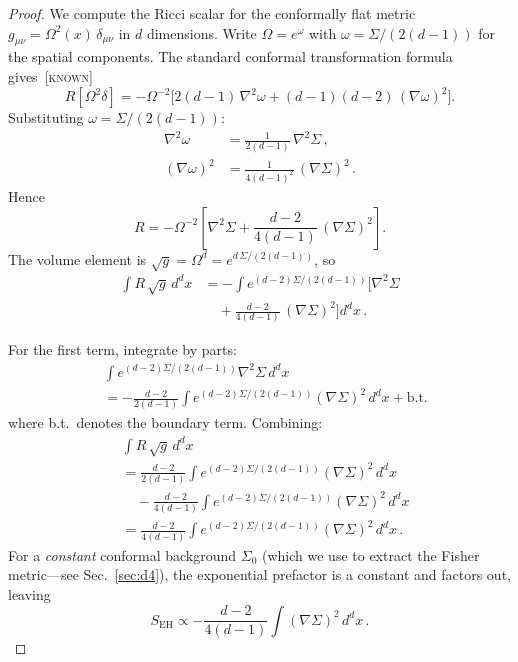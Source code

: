 \documentclass[prd,twocolumn,superscriptaddress,longbibliography]{revtex4-2}
\newcommand{\SEH}{S_{\mathrm{EH}}}
\newcommand{\known}{\textsc{[known]}}
\begin{document}
\begin{proof}
We compute the Ricci scalar for the conformally
flat metric $g_{\mu\nu} = \Omega^2(x)\,\delta_{\mu\nu}$ in
$d$ dimensions.
Write $\Omega = e^{\omega}$ with $\omega = \Sigma/(2(d-1))$
for the spatial components.
The standard conformal transformation
formula~\cite{Wald1984} gives~\known
\begin{equation}\label{eq:R_conformal}
  R[\Omega^2\delta]
  = -\Omega^{-2}\!\Big[
  2(d\!-\!1)\,\nabla^2\omega
  + (d\!-\!1)(d\!-\!2)\,(\nabla\omega)^2
  \Big].
\end{equation}
Substituting $\omega = \Sigma/(2(d-1))$:
\begin{align}
  \nabla^2\omega &= \frac{1}{2(d-1)}\,\nabla^2\Sigma\,,\\[3pt]
  (\nabla\omega)^2 &= \frac{1}{4(d-1)^2}\,(\nabla\Sigma)^2\,.
\end{align}
Hence
\begin{equation}\label{eq:R_intermediate}
  R = -\Omega^{-2}\!\left[
  \nabla^2\Sigma
  + \frac{d-2}{4(d-1)}\,(\nabla\Sigma)^2
  \right]\!.
\end{equation}
The volume element is
$\sqrt{g} = \Omega^d = e^{d\,\Sigma/(2(d-1))}$, so
\begin{align}
  \int R\,\sqrt{g}\,d^dx
  &= -\int e^{(d-2)\Sigma/(2(d-1))}\bigg[
  \nabla^2\Sigma
  \nonumber\\
  &\quad
  + \frac{d-2}{4(d-1)}\,(\nabla\Sigma)^2
  \bigg] d^dx\,.
  \label{eq:SEH_intermediate}
\end{align}

For the first term, integrate by parts:
\begin{align}
  &\int e^{(d-2)\Sigma/(2(d-1))}\nabla^2\Sigma\,d^dx
  \nonumber\\
  &= -\frac{d-2}{2(d-1)}\int e^{(d-2)\Sigma/(2(d-1))}
  (\nabla\Sigma)^2\,d^dx
  + \text{b.t.}
\end{align}
where b.t.\ denotes the boundary term.
Combining:
\begin{align}
  &\int R\,\sqrt{g}\,d^dx
  \nonumber\\
  &= \frac{d-2}{2(d-1)}\int e^{(d-2)\Sigma/(2(d-1))}
  (\nabla\Sigma)^2\,d^dx
  \nonumber\\
  &\quad
  - \frac{d-2}{4(d-1)}\int e^{(d-2)\Sigma/(2(d-1))}
  (\nabla\Sigma)^2\,d^dx
  \nonumber\\
  &= \frac{d-2}{4(d-1)}\int e^{(d-2)\Sigma/(2(d-1))}
  (\nabla\Sigma)^2\,d^dx\,.
  \label{eq:SEH_almost}
\end{align}
For a \emph{constant} conformal background
$\Sigma_0$ (which we use to extract the Fisher
metric---see Sec.~\ref{sec:d4}), the exponential
prefactor is a constant and factors out, leaving
\begin{equation}
  \SEH
  \propto
  -\frac{d-2}{4(d-1)}\int (\nabla\Sigma)^2\,d^dx\,.
\end{equation}


\end{proof}
\end{document}
